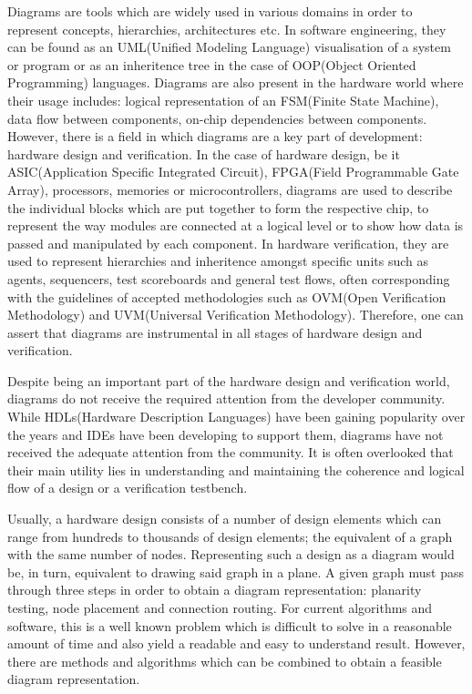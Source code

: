 Diagrams are tools which are widely used in various domains in order to represent
concepts, hierarchies, architectures etc. In software engineering, they can be found as
an UML(Unified Modeling Language) visualisation of a system or program or as an inheritence
tree in the case of OOP(Object Oriented Programming) languages. Diagrams are also present 
in the hardware world where their usage includes: logical representation of an FSM(Finite State Machine), 
data flow between components, on-chip dependencies between components. However, there is a field in 
which diagrams are a key part of development: hardware design and verification. In the case of hardware design, 
be it ASIC(Application Specific Integrated Circuit), FPGA(Field Programmable Gate Array), processors, memories or
microcontrollers, diagrams are used to describe the individual blocks which are put together to form the respective chip, 
to represent the way modules are connected at a logical level or to show how data is passed and manipulated by each component. 
In hardware verification, they are used to represent hierarchies and inheritence amongst specific units such as agents, 
sequencers, test scoreboards and general test flows, often corresponding with the guidelines of accepted methodologies such
as OVM(Open Verification Methodology) and UVM(Universal Verification Methodology). Therefore, one can assert that diagrams 
are instrumental in all stages of hardware design and verification.

Despite being an important part of the hardware design and verification world, diagrams do not receive the required attention 
from the developer community. While HDLs(Hardware Description Languages) have been gaining popularity over the years and IDEs 
have been developing to support them, diagrams have not received the adequate attention from the community. It is often 
overlooked that their main utility lies in understanding and maintaining the coherence and logical flow of a design
or a verification testbench. 

Usually, a hardware design consists of a number of design elements which can range from hundreds to thousands of design elements; 
the equivalent of a graph with the same number of nodes. Representing such a design as a diagram would be, in turn, equivalent to 
drawing said graph in a plane. A given graph must pass through three steps in order to obtain a diagram representation: planarity 
testing, node placement and connection routing. For current algorithms and software, this is a well known problem which is difficult 
to solve in a reasonable amount of time and also yield a readable and easy to understand result. However, there are methods and 
algorithms which can be combined to obtain a feasible diagram representation. 

